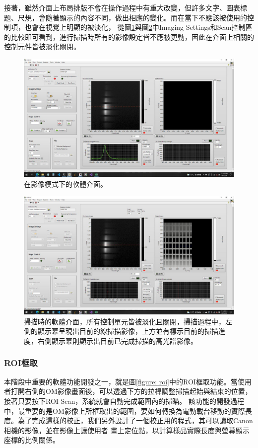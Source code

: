 \documentclass[12pt]{article}
\begin{document}
接著，雖然介面上布局排版不會在操作過程中有重大改變，但許多文字、圖表標題、尺規，會隨著顯示的內容不同，做出相應的變化。而在當下不應該被使用的控制項，也會在視覺上明顯的被淡化，
從圖\ref{figure: acquire mode}與圖\ref{figure: scanning}中Imaging Settings和Scan控制區的比較即可看到，進行掃描時所有的影像設定皆不應被更動，因此在介面上相關的控制元件皆被淡化關閉。
\begin{figure}
    \centering
    \includegraphics[width=\linewidth]{acquire.jpeg}
    \caption{在影像模式下的軟體介面。}
    \label{figure: acquire mode}
\end{figure}
\begin{figure}
    \centering
    \includegraphics[width=\linewidth]{scanning.jpeg}
    \caption[掃描時的軟體介面。]{掃描時的軟體介面，所有控制單元皆被淡化且關閉，掃描過程中，左側的顯示幕呈現出目前的線掃描影像，上方並有標示目前的掃描進度，右側顯示幕則顯示出目前已完成掃描的高光譜影像。}
    \label{figure: scanning}
\end{figure}
\subsubsection{ROI框取}
本階段中重要的軟體功能開發之一，就是圖\ref{figure: roi}中的ROI框取功能。當使用者打開右側的OM影像畫面後，可以透過下方的拉桿調整掃描起始與結束的位置，接著只要按下ROI Scan，系統就會自動完成範圍內的掃瞄。
該功能的開發過程中，最重要的是OM影像上所框取出的範圍，要如何轉換為電動載台移動的實際長度。為了完成這樣的校正，我們另外設計了一個校正用的程式，其可以讀取Canon 相機的影像，並在影像上讓使用者
畫上定位點，以計算樣品實際長度與螢幕顯示座標的比例關係。
\end{document}
